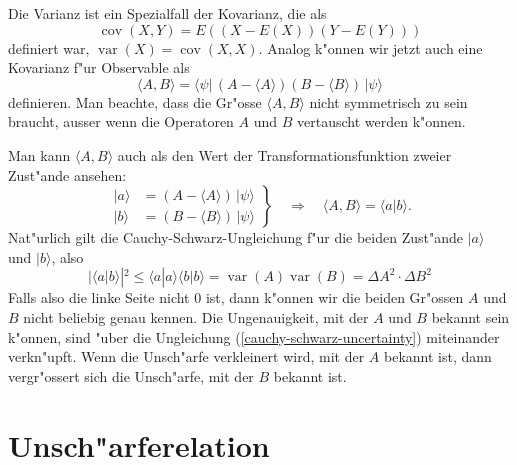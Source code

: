Die Varianz ist ein Spezialfall der Kovarianz, die als 
\[
\operatorname{cov}(X,Y)
=
E((X-E(X))(Y-E(Y)))
\]
definiert war, $\operatorname{var}(X)=\operatorname{cov}(X,X)$.
Analog k"onnen wir jetzt auch eine Kovarianz f"ur Observable als
\[
\langle A,B\rangle
=
\langle\psi|
\,
(A-\langle A\rangle)(B-\langle B\rangle)
\,
|\psi\rangle
\]
definieren.
Man beachte, dass die Gr"osse $\langle A,B\rangle$ nicht symmetrisch zu
sein braucht, ausser wenn die Operatoren $A$ und $B$ vertauscht werden
k"onnen.

Man kann $\langle A,B\rangle$ auch als den Wert der Transformationsfunktion 
zweier Zust"ande ansehen:
\begin{equation}
\left.
\begin{aligned}
|a\rangle &= (A-\langle A\rangle)\,|\psi\rangle\\
|b\rangle &= (B-\langle B\rangle)\,|\psi\rangle
\end{aligned}
\right\}
\quad
\Rightarrow
\quad
\langle A,B\rangle = \langle a|b\rangle.
\end{equation}
Nat"urlich gilt die Cauchy-Schwarz-Ungleichung f"ur die beiden
Zust"ande $|a\rangle$ und $|b\rangle$, also
\begin{equation}
|\langle a|b\rangle|^2
\le
\langle a|a\rangle \langle b|b\rangle
=
\operatorname{var}(A)\operatorname{var}(B)
=\Delta A^2 \cdot \Delta B^2
\label{cauchy-schwarz-uncertainty}
\end{equation}
Falls also die linke Seite nicht $0$ ist, dann k"onnen wir die beiden
Gr"ossen $A$ und $B$ nicht beliebig genau kennen.
Die Ungenauigkeit, mit der $A$ und $B$ bekannt sein k"onnen, sind "uber
die Ungleichung (\ref{cauchy-schwarz-uncertainty}) miteinander verkn"upft.
Wenn die Unsch"arfe verkleinert wird, mit der $A$ bekannt ist, dann 
vergr"ossert sich die Unsch"arfe, mit der $B$ bekannt ist.

%
%
\section{Unsch"arferelation}
